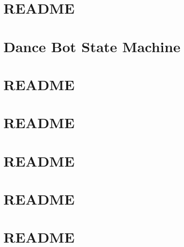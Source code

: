 \documentclass[twoside]{book}
\newcommand{\+}{\discretionary{\mbox{\scriptsize$\hookleftarrow$}}{}{}}
\begin{document}
\chapter{R\+E\+A\+D\+ME}
\label{md_smacc_sm_reference_library_sm_dance_bot_README}

\chapter{Dance Bot State Machine}
\label{md_smacc_sm_reference_library_sm_dance_bot_strikes_back_launch_readme}

\chapter{R\+E\+A\+D\+ME}
\label{md_smacc_sm_reference_library_sm_dance_bot_strikes_back_README}

\chapter{R\+E\+A\+D\+ME}
\label{md_smacc_sm_reference_library_sm_moveit_README}

\chapter{R\+E\+A\+D\+ME}
\label{md_smacc_sm_reference_library_sm_opencv_README}

\chapter{R\+E\+A\+D\+ME}
\label{md_smacc_sm_reference_library_sm_opencv_2_README}

\chapter{R\+E\+A\+D\+ME}
\label{md_smacc_sm_reference_library_sm_opencv_3_README}

\end{document}
